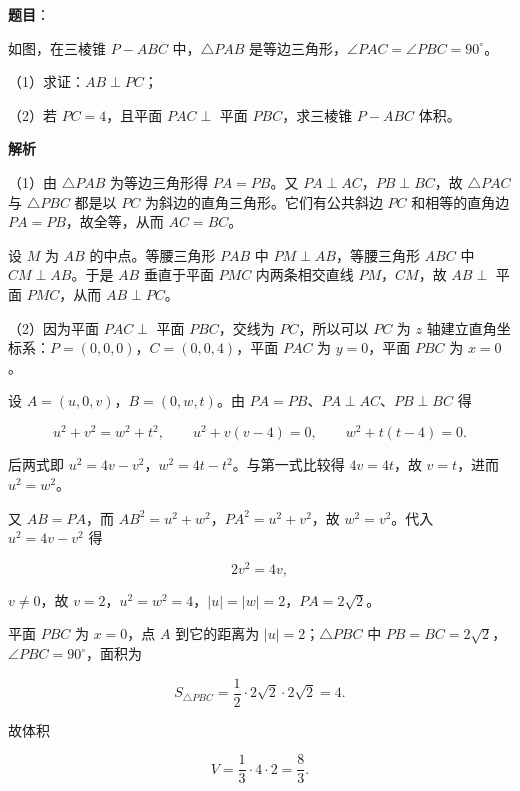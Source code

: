 \begin{answer}

\textbf{题目}：

如图，在三棱锥 $P-ABC$ 中，$\triangle PAB$ 是等边三角形，$\angle PAC=\angle PBC=90^\circ$。

（1）求证：$AB\perp PC$；

（2）若 $PC=4$，且平面 $PAC\perp$ 平面 $PBC$，求三棱锥 $P-ABC$ 体积。
\nopagebreak[4]
\begin{center}\end{center}
\nopagebreak[4]
\textbf{解析}

（1）由 $\triangle PAB$ 为等边三角形得 $PA=PB$。又 $PA\perp AC$，$PB\perp BC$，故 $\triangle PAC$ 与 $\triangle PBC$ 都是以 $PC$ 为斜边的直角三角形。它们有公共斜边 $PC$ 和相等的直角边 $PA=PB$，故全等，从而 $AC=BC$。

设 $M$ 为 $AB$ 的中点。等腰三角形 $PAB$ 中 $PM\perp AB$，等腰三角形 $ABC$ 中 $CM\perp AB$。于是 $AB$ 垂直于平面 $PMC$ 内两条相交直线 $PM$，$CM$，故 $AB\perp$ 平面 $PMC$，从而 $AB\perp PC$。

（2）因为平面 $PAC\perp$ 平面 $PBC$，交线为 $PC$，所以可以 $PC$ 为 $z$ 轴建立直角坐标系：$P=(0,0,0)$，$C=(0,0,4)$，平面 $PAC$ 为 $y=0$，平面 $PBC$ 为 $x=0$。

设 $A=(u,0,v)$，$B=(0,w,t)$。由 $PA=PB$、$PA\perp AC$、$PB\perp BC$ 得

\nopagebreak[4]
\[u^2+v^2=w^2+t^2,\qquad u^2+v(v-4)=0,\qquad w^2+t(t-4)=0 .\]

后两式即 $u^2=4v-v^2$，$w^2=4t-t^2$。与第一式比较得 $4v=4t$，故 $v=t$，进而 $u^2=w^2$。

又 $AB=PA$，而 $AB^2=u^2+w^2$，$PA^2=u^2+v^2$，故 $w^2=v^2$。代入 $u^2=4v-v^2$ 得

\nopagebreak[4]
\[2v^2=4v,\]

$v\neq0$，故 $v=2$，$u^2=w^2=4$，$|u|=|w|=2$，$PA=2\sqrt2$。

平面 $PBC$ 为 $x=0$，点 $A$ 到它的距离为 $|u|=2$；$\triangle PBC$ 中 $PB=BC=2\sqrt2$，$\angle PBC=90^\circ$，面积为

\nopagebreak[4]
\[S_{\triangle PBC}=\frac12\cdot2\sqrt2\cdot2\sqrt2=4 .\]

故体积

\nopagebreak[4]
\[V=\frac13\cdot4\cdot2=\frac83 .\]


\end{answer}
